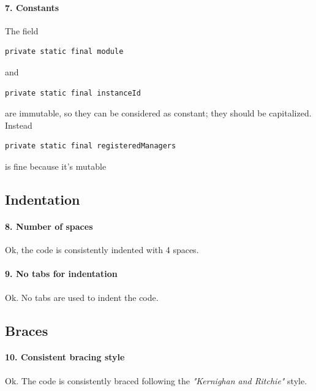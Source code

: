 \documentclass[english]{article}
\begin{document}
\paragraph{7. Constants}
The field 
\begin{lstlisting} 
private static final module 
\end{lstlisting} 
and 
\begin{lstlisting} 
private static final instanceId 
\end{lstlisting} 
are immutable, so they can be considered as constant; they should be capitalized. \\
Instead 
\begin{lstlisting} 
private static final registeredManagers 
\end{lstlisting}
 is fine because it's mutable


\subsection{Indentation}

\paragraph{8. Number of spaces}
Ok, the code is consistently indented with 4 spaces.

\paragraph{9. No tabs for indentation}
Ok. No tabs are used to indent the code.

\subsection{Braces}

\paragraph{10. Consistent bracing style}
Ok.
The code is consistently braced following the \textit{"Kernighan and Ritchie"} style.
\end{document}
